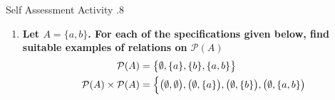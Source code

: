 \documentclass[../notes.tex]{subfiles}
\begin{document}
\begin{exercise}{Self Assessment Activity \thechapter.8}
\begin{enumerate}
\begin{enumerate}[label=(\alph*)]
									$R \circ R = R; R$.
									\begin{adjustwidth}{1cm}{}
										$\bigl(1, \{1\}\bigr) \rightarrow \bigl(\{1\}, 3\bigr) \rightarrow \bigl(1, 3\bigr)$\\
										$\bigl(1, 3\bigr) \not \rightarrow$\\
										$\bigl(2, \{1\}\bigr) \rightarrow \bigl(\{1\}, 3\bigr) \rightarrow \bigl(2, 3\bigr)$\\
										$\bigl(2, \{2\}\bigr) \rightarrow \bigl(\{2\}, \{1\}\bigr) \rightarrow \bigl(2, \{1\}\bigr)$\\
										$\bigl(\{1\}, 3\bigr) \not \rightarrow$\\
										$\bigl(\{2\}, \{1\}\bigr) \rightarrow \bigl(\{1\}, 3\bigr) \rightarrow \bigl(\{2\}, 3\bigr)$
									\end{adjustwidth}
									$R \circ R = R; R = \Bigl\{\bigl(1, 3\bigr), \bigl(2, 3\bigr), \bigl(2, \{1\}\bigr), \bigl(\{2\}, 3\bigr)\Bigr\}$
								\item \textbf{Determine the relation $R \circ P$.}
									$R \circ P = P;R$.
									\begin{adjustwidth}{1cm}{}
										$\bigl(1, \{1\}\bigr) \rightarrow \bigl(\{1\}, 3\bigr) \rightarrow \bigl(1, 3\bigr)$\\
										$\bigl(1, 2\bigr) \rightarrow \bigl(2, \{1\}\bigr) \rightarrow \bigl(1, \{1\}\bigr)$\\
										$\bigl(1, 2\bigr) \rightarrow \bigl(2, \{2\}\bigr) \rightarrow \bigl(1, \{2\}\bigr)$
									\end{adjustwidth}
									$R \circ P = R;R = \Bigl\{\bigl(1, 3\bigr), \bigl(1, \{1\}\bigr), \bigl(1, \{2\}\bigr)\Bigr\}$
								\item \textbf{Give the subset $T$ of $R$ where $(a, B) \in T$ iff $a \in B$.}\\
									$T = \Bigl\{\bigl(1, \{1\}\bigr), \bigl(2, \{2\}\bigr)\Bigr\}$
							\end{enumerate}
						\pagebreak
						\item \textbf{Let $A = \{a, b\}$. For each of the specifications given below, find suitable examples of relations on $\mathcal{P}(A)$}
							\begin{align*}
								\mathcal{P}(A) &= \bigl\{\emptyset, \{a\}, \{b\}, \{a, b\}\bigr\}\\
								\mathcal{P}(A) \times \mathcal{P}(A) &= \Bigl\{
									\bigl(\emptyset, \emptyset\bigr), \bigl(\emptyset, \{a\}\bigr), \bigl(\emptyset, \{b\}\bigr), \bigl(\emptyset, \{a, b\}\bigr)\\

\end{align*}
\end{enumerate}
\end{exercise}
\end{document}
